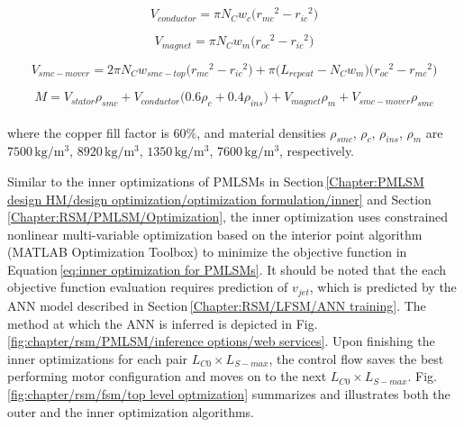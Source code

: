                 
                \begin{equation}
                    V_{conductor} = \pi N_C w_c \big( {r_{mc}}^2-{r_{ic}}^2 \big)
                    \label{eq:rsm/LFSM/V_conductor}
                \end{equation}
                
                
                \begin{equation}
                    V_{magnet} = \pi N_C w_m \big( {r_{oc}}^2-{r_{ic}}^2 \big)
                    \label{eq:rsm/LFSM/V_magnet}
                \end{equation}
                
                
                \begin{equation}
                    V_{smc-mover} = 2 \pi N_C w_{smc-top} \big( {r_{mc}}^2-{r_{ic}}^2 \big) + \pi \big( L_{repeat}-N_C w_m \big) \big( {r_{oc}}^2-{r_{mc}}^2 \big) 
                    \label{eq:rsm/LFSM/V_smc_mover}
                \end{equation}
                
                
                \begin{equation}
                    M= V_{stator} \rho_{smc} + V_{conductor} \big(0.6\rho_c + 0.4\rho_{ins} \big) + V_{magnet} \rho_{m} + V_{smc-mover} \rho_{smc}
                    \label{eq:rsm/LFSM/M}
                \end{equation} \\
                
                
                where the copper fill factor is $60\%$, and material densities $\rho_{smc}$, $\rho_c$, $\rho_{ins}$, $\rho_{m}$ are $7500\,\mathrm{kg/m^3}$, $8920\,\mathrm{kg/m^3}$, $1350\,\mathrm{kg/m^3}$, $7600\,\mathrm{kg/m^3}$, respectively. 
                
                
                Similar to the inner optimizations of \acsp{PMLSM} in Section\,\ref{Chapter:PMLSM design HM/design optimization/optimization formulation/inner} and Section\,\ref{Chapter:RSM/PMLSM/Optimization}, the inner optimization uses constrained nonlinear multi-variable optimization based on the interior point algorithm (MATLAB Optimization Toolbox) to minimize the objective function in Equation\,\ref{eq:inner optimization for PMLSMs}. It should be noted that the each objective function evaluation requires prediction of $v_{jet}$, which is predicted by the \acs{ANN} model described in Section\,\ref{Chapter:RSM/LFSM/ANN training}. The method at which the \acs{ANN} is inferred is depicted in Fig.\,\ref{fig:chapter/rsm/PMLSM/inference options/web services}. Upon finishing the inner optimizations for each pair $L_{C0} \times L_{S-max}$, the control flow saves the best performing motor configuration and moves on to the next $L_{C0} \times L_{S-max}$. Fig.\,\ref{fig:chapter/rsm/fsm/top level optmization} summarizes and illustrates both the outer and the inner optimization algorithms.
                
